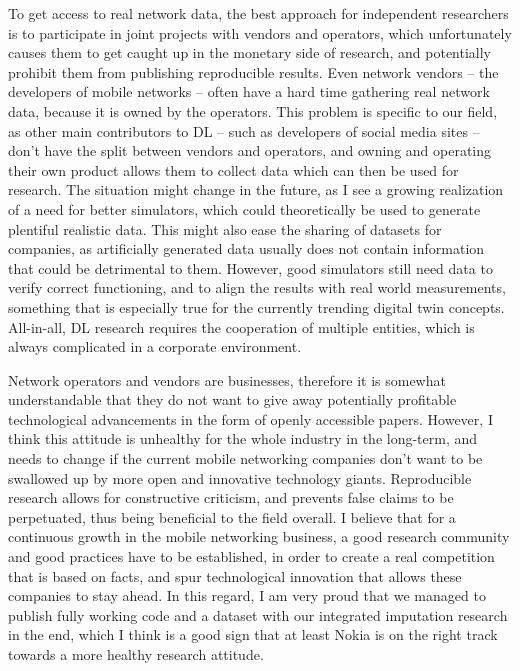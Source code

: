 			To get access to real network data, the best approach for independent researchers is to participate in joint projects with vendors and operators, which unfortunately causes them to get caught up in the monetary side of research, and potentially prohibit them from publishing reproducible results.				
			Even network vendors -- the developers of mobile networks -- often have a hard time gathering real network data, because it is owned by the operators.
			This problem is specific to our field, as other main contributors to \ac{DL} -- such as developers of social media sites -- don't have the split between vendors and operators, and owning and operating their own product allows them to collect data which can then be used for research.
			The situation might change in the future, as I see a growing realization of a need for better simulators, which could theoretically be used to generate plentiful realistic data.			
			This might also ease the sharing of datasets for companies, as artificially generated data usually does not contain information that could be detrimental to them.			
			However, good simulators still need data to verify correct functioning, and to align the results with real world measurements, something that is especially true for the currently trending digital twin concepts.
			All-in-all, \ac{DL} research requires the cooperation of multiple entities, which is always complicated in a corporate environment.
			
			Network operators and vendors are businesses, therefore it is somewhat understandable that they do not want to give away potentially profitable technological advancements in the form of openly accessible papers.
			However, I think this attitude is unhealthy for the whole industry in the long-term, and needs to change if the current mobile networking companies don't want to be swallowed up by more open and innovative technology giants.
			Reproducible research allows for constructive criticism, and prevents false claims to be perpetuated, thus being beneficial to the field overall.
			I believe that for a continuous growth in the mobile networking business, a good research community and good practices have to be established, in order to create a real competition that is based on facts, and spur technological innovation that allows these companies to stay ahead.
			In this regard, I am very proud that we managed to publish fully working code and a dataset with our integrated imputation research in the end, which I think is a good sign that at least Nokia is on the right track towards a more healthy research attitude.
			
